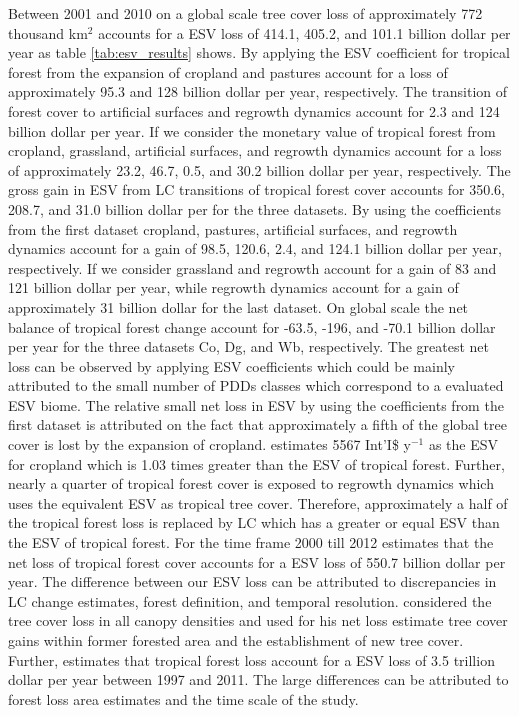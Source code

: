 		Between 2001 and 2010 on a global scale tree cover loss of approximately 772 thousand km$^2$ accounts for a \ac{ESV} loss of 414.1, 405.2, and 101.1 billion dollar per year as table \ref{tab:esv_results} shows. By applying the \ac{ESV} coefficient for tropical forest from \citet{Costanza2014} the expansion of cropland and pastures account for a loss of approximately 95.3 and 128 billion dollar per year, respectively. The transition of forest cover to artificial surfaces and regrowth dynamics account for 2.3 and 124 billion dollar per year. If we consider the monetary value of tropical forest from \citet{Siikamaki2015} cropland, grassland, artificial surfaces, and regrowth dynamics account for a loss of approximately 23.2, 46.7, 0.5, and 30.2 billion dollar per year, respectively. The gross gain in \ac{ESV} from \ac{LC} transitions of tropical forest cover accounts for 350.6, 208.7, and 31.0 billion dollar per for the three datasets. By using the coefficients from the first dataset cropland, pastures, artificial surfaces, and regrowth dynamics account for a gain of 98.5, 120.6, 2.4, and 124.1 billion dollar per year, respectively. If we consider \citet{Groot2012} grassland and regrowth account for a gain of 83 and 121 billion dollar per year, while regrowth dynamics account for a gain of approximately 31 billion dollar for the last dataset. On global scale the net balance of tropical forest change account for -63.5, -196, and -70.1 billion dollar per year for the three datasets Co, Dg, and Wb, respectively. The greatest net loss can be observed by applying \citeauthor{Groot2012} \ac{ESV} coefficients which could be mainly attributed to the small number of \acp{PDD} classes which correspond to a evaluated \ac{ESV} biome. The relative small net loss in \ac{ESV} by using the coefficients from the first dataset is attributed on the fact that approximately a fifth of the global tree cover is lost by the expansion of cropland. \citeauthor{Costanza2014} estimates 5567 Int'I\$ y$^{-1}$ as the \ac{ESV} for cropland which is 1.03 times greater than the \ac{ESV} of tropical forest. Further, nearly a quarter of tropical forest cover is exposed to regrowth dynamics which uses the equivalent \ac{ESV} as tropical tree cover. Therefore, approximately a half of the tropical forest loss is replaced by \ac{LC} which has a greater or equal \ac{ESV} than the \ac{ESV} of tropical forest. For the time frame 2000 till 2012 \citet{Song2018} estimates that the net loss of tropical forest cover accounts for a \ac{ESV} loss of 550.7 billion dollar per year. The difference between our \ac{ESV} loss can be attributed to discrepancies in \ac{LC} change estimates, forest definition, and temporal resolution. \citeauthor{Song2018} considered the tree cover loss in all canopy densities and used for his net loss estimate tree cover gains within former forested area and the establishment of new tree cover. Further, \citet{Costanza2014} estimates that tropical forest loss account for a \ac{ESV} loss of 3.5 trillion dollar per year between 1997 and 2011. The large differences can be attributed to forest loss area estimates and the time scale of the study. 

